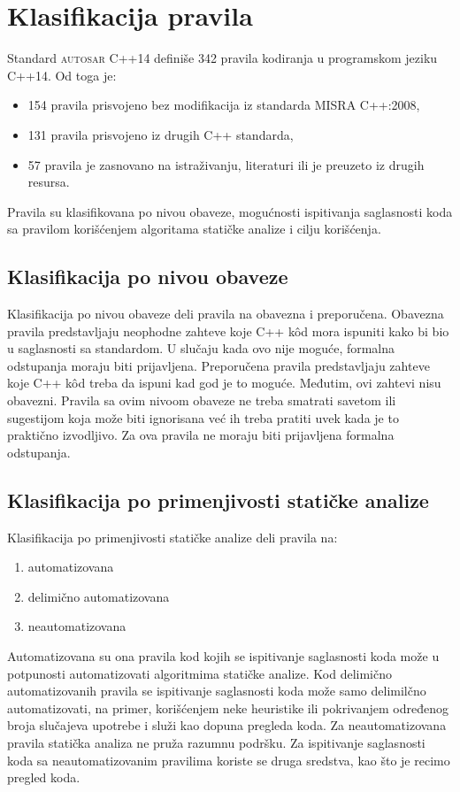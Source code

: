 \documentclass[12pt,oneside]{memoir}
\begin{document}
\section{Klasifikacija pravila}
Standard \textsc{autosar} C++14 definiše 342 pravila kodiranja u programskom jeziku C++14. Od toga je:
\begin{itemize}
  \item {154 pravila prisvojeno bez modifikacija iz standarda MISRA C++:2008,}
  \item {131 pravila prisvojeno iz drugih C++ standarda,}
  \item {57 pravila je zasnovano na istraživanju, literaturi ili je preuzeto iz drugih resursa.}
\end{itemize}
Pravila su klasifikovana po nivou obaveze, mogućnosti ispitivanja saglasnosti koda sa pravilom korišćenjem algoritama
statičke analize i cilju korišćenja.

\subsection{Klasifikacija po nivou obaveze}
Klasifikacija po nivou obaveze deli pravila na obavezna i preporučena.
Obavezna pravila predstavljaju neophodne zahteve koje C++ k\^{o}d mora ispuniti kako bi bio u saglasnosti sa standardom. U slučaju kada ovo nije moguće,
formalna odstupanja moraju biti prijavljena.
Preporučena pravila predstavljaju zahteve koje C++ k\^{o}d treba da ispuni kad god je to mogu\'{c}e. Međutim, ovi zahtevi nisu obavezni. Pravila
sa ovim nivoom obaveze ne treba smatrati savetom ili sugestijom koja može biti ignorisana ve\'{c} ih treba pratiti uvek kada je to prakti\v{c}no izvodljivo. Za ova pravila ne moraju biti prijavljena formalna odstupanja.

\subsection{Klasifikacija po primenjivosti statičke analize}
Klasifikacija po primenjivosti statičke analize deli pravila na: 
\begin{enumerate}
  \item{automatizovana}
  \item{delimično automatizovana}
  \item{neautomatizovana}
\end{enumerate}
Automatizovana su ona pravila kod kojih se ispitivanje saglasnosti koda može u potpunosti automatizovati algoritmima statičke analize.
Kod delimično automatizovanih pravila se ispitivanje saglasnosti koda može samo delimilčno automatizovati, na primer, korišćenjem neke heuristike ili pokrivanjem određenog broja slučajeva upotrebe i služi kao dopuna pregleda koda.
Za neautomatizovana pravila statička analiza ne pruža razumnu podršku. Za ispitivanje saglasnosti koda sa neautomatizovanim pravilima koriste se druga sredstva, kao što je recimo pregled koda.
\end{document}
